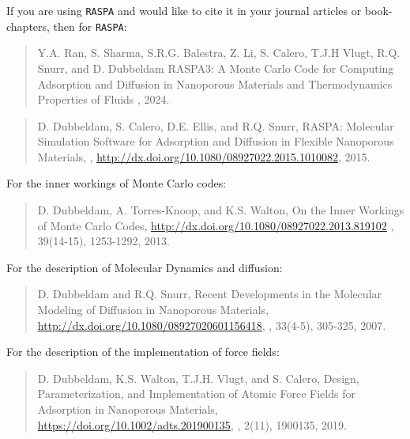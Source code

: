 If you are using \texttt{RASPA} and would like to cite it in your journal articles or book-chapters, then for \texttt{RASPA}:

\begin{quote}
Y.A. Ran, S. Sharma, S.R.G. Balestra, Z. Li, S. Calero, T.J.H Vlugt, R.Q. Snurr, and D. Dubbeldam
\newblock RASPA3: A Monte Carlo Code for Computing Adsorption and Diffusion in Nanoporous Materials and Thermodynamics Properties of Fluids
, 2024.
\end{quote}
\begin{quote}
D. Dubbeldam, S. Calero, D.E. Ellis, and R.Q. Snurr,
\newblock RASPA: Molecular Simulation Software for Adsorption and Diffusion in Flexible Nanoporous Materials,
, \url{http://dx.doi.org/10.1080/08927022.2015.1010082}, 2015.
\end{quote}
For the inner workings of Monte Carlo codes:
\begin{quote}
D. Dubbeldam, A. Torres-Knoop, and K.S. Walton,
\newblock On the Inner Workings of Monte Carlo Codes,
\newblock  \url{http://dx.doi.org/10.1080/08927022.2013.819102}
, 39(14-15), 1253-1292, 2013.
\end{quote}
For the description of Molecular Dynamics and diffusion:
\begin{quote}
D. Dubbeldam and R.Q. Snurr,
\newblock Recent Developments in the Molecular Modeling of Diffusion in Nanoporous Materials,
\newblock  \url{http://dx.doi.org/10.1080/08927020601156418},
, 33(4-5), 305-325, 2007.
\end{quote}
For the description of the implementation of force fields:
\begin{quote}
D. Dubbeldam, K.S. Walton, T.J.H. Vlugt, and S. Calero,
\newblock Design, Parameterization, and Implementation of Atomic Force Fields for Adsorption in Nanoporous Materials,
\newblock  \url{https://doi.org/10.1002/adts.201900135},
, 2(11), 1900135, 2019.
\end{quote}

